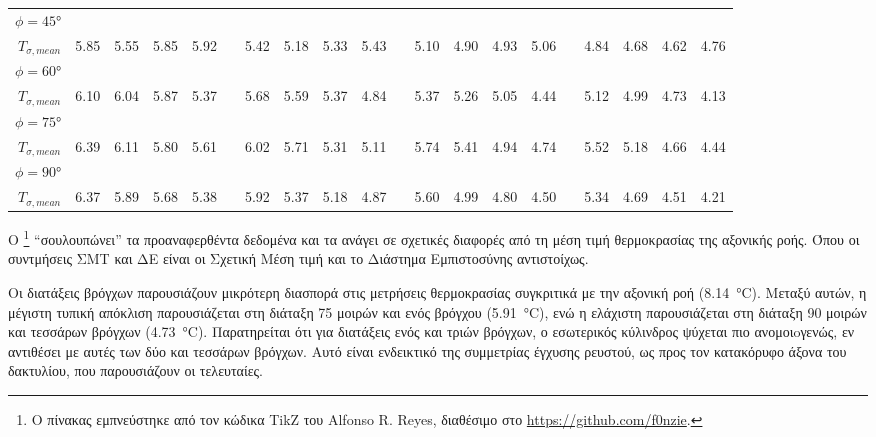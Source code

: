 \begin{landscape}
\begin{table*}[htbp]
\begin{adjustbox}{width=1.45\textheight, center = \textheight}
\begin{tabular}{@{}rrrrrcrrrrcrrrrcrrrr@{}}
$\phi=\ang{45}$\\
$\scriptstyle{T_{\sigma, mean}}$ & 5.85 & 5.55 & 5.85 & 5.92 && 5.42 & 5.18 & 5.33 & 5.43 && 5.10 & 4.90 & 4.93 & 5.06 && 4.84 & 4.68 & 4.62 & 4.76\\ 
$\phi=\ang{60}$\\
$\scriptstyle{T_{\sigma, mean}}$ & 6.10 & 6.04 & 5.87 & 5.37 && 5.68 & 5.59 & 5.37 & 4.84 && 5.37 & 5.26 & 5.05 & 4.44 && 5.12 & 4.99 & 4.73 & 4.13\\ 
$\phi=\ang{75}$\\
$\scriptstyle{T_{\sigma, mean}}$ & 6.39 & 6.11 & 5.80 & 5.61 && 6.02 & 5.71 & 5.31 & 5.11 && 5.74 & 5.41 & 4.94 & 4.74 && 5.52 & 5.18 & 4.66 & 4.44\\
$\phi=\ang{90}$\\
$\scriptstyle{T_{\sigma, mean}}$ & 6.37 & 5.89 & 5.68 & 5.38 && 5.92 & 5.37 & 5.18 & 4.87 && 5.60 & 4.99 & 4.80 & 4.50 && 5.34 & 4.69 & 4.51 & 4.21\\
\bottomrule
\end{tabular}
\end{adjustbox}
\end{table*}

\end{landscape}

Ο \footnote{Ο πίνακας εμπνεύστηκε από τον κώδικα TikZ του Alfonso R. Reyes, διαθέσιμο στο \href{https://github.com/f0nzie/tikz_favorites/blob/master/src/fileIO-table-read_data+fileio+pgf+table.tex}{https://github.com/f0nzie}.} \enquote{σουλουπώνει} τα προαναφερθέντα δεδομένα και τα ανάγει σε σχετικές διαφορές από τη μέση τιμή θερμοκρασίας της αξονικής ροής. Όπου οι συντμήσεις ΣΜΤ και ΔΕ είναι οι Σχετική Μέση τιμή και το Διάστημα Εμπιστοσύνης αντιστοίχως. 

Οι διατάξεις βρόγχων παρουσιάζουν μικρότερη διασπορά στις μετρήσεις θερμοκρασίας συγκριτικά με την αξονική ροή (\qty{8.14}{\degreeCelsius}). Μεταξύ αυτών, η μέγιστη τυπική απόκλιση παρουσιάζεται στη διάταξη 75 μοιρών και ενός βρόγχου (\qty{5.91}{\degreeCelsius}), ενώ η ελάχιστη παρουσιάζεται στη διάταξη 90 μοιρών και τεσσάρων βρόγχων  (\qty{4.73}{\degreeCelsius}).  Παρατηρείται ότι για διατάξεις ενός και τριών βρόγχων, ο εσωτερικός κύλινδρος ψύχεται πιο ανομοιoγενώς, εν αντιθέσει με αυτές των δύο και τεσσάρων βρόγχων. Αυτό είναι ενδεικτικό της συμμετρίας έγχυσης ρευστού, ως προς τον κατακόρυφο άξονα του δακτυλίου, που παρουσιάζουν οι τελευταίες.

\data
{}

